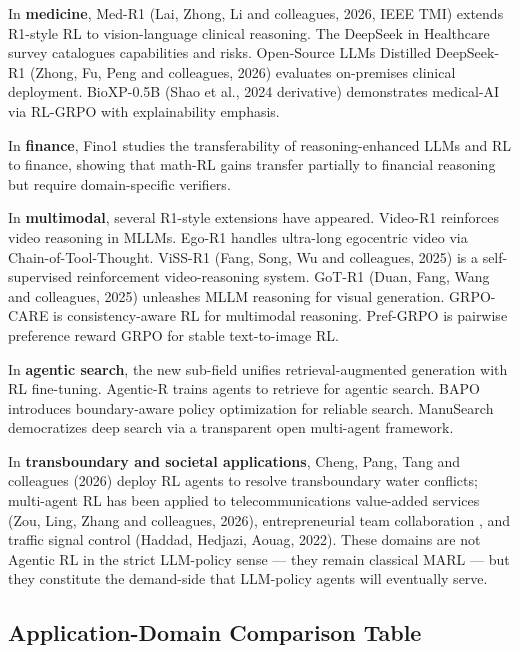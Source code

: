 \documentclass{article}
\begin{document}
In \textbf{medicine}, Med-R1 (Lai, Zhong, Li and colleagues, 2026, IEEE TMI) extends R1-style RL to vision-language clinical reasoning. The DeepSeek in Healthcare survey \citep{ye20242024} catalogues capabilities and risks. Open-Source LLMs Distilled DeepSeek-R1 (Zhong, Fu, Peng and colleagues, 2026) evaluates on-premises clinical deployment. BioXP-0.5B (Shao et al., 2024 derivative) demonstrates medical-AI via RL-GRPO with explainability emphasis.

In \textbf{finance}, Fino1 \citep{qian20252025} studies the transferability of reasoning-enhanced LLMs and RL to finance, showing that math-RL gains transfer partially to financial reasoning but require domain-specific verifiers.

In \textbf{multimodal}, several R1-style extensions have appeared. Video-R1 \citep{feng20252025} reinforces video reasoning in MLLMs. Ego-R1 \citep{tian20252025} handles ultra-long egocentric video via Chain-of-Tool-Thought. ViSS-R1 (Fang, Song, Wu and colleagues, 2025) is a self-supervised reinforcement video-reasoning system. GoT-R1 (Duan, Fang, Wang and colleagues, 2025) unleashes MLLM reasoning for visual generation. GRPO-CARE \citep{chen20252025} is consistency-aware RL for multimodal reasoning. Pref-GRPO \citep{wang20252025} is pairwise preference reward GRPO for stable text-to-image RL.

In \textbf{agentic search}, the new sub-field unifies retrieval-augmented generation with RL fine-tuning. Agentic-R \citep{liu20262026} trains agents to retrieve for agentic search. BAPO \citep{liu20262026} introduces boundary-aware policy optimization for reliable search. ManuSearch \citep{huang20252025} democratizes deep search via a transparent open multi-agent framework.

In \textbf{transboundary and societal applications}, Cheng, Pang, Tang and colleagues (2026) deploy RL agents to resolve transboundary water conflicts; multi-agent RL has been applied to telecommunications value-added services (Zou, Ling, Zhang and colleagues, 2026), entrepreneurial team collaboration \citep{wang20262026}, and traffic signal control (Haddad, Hedjazi, Aouag, 2022). These domains are not Agentic RL in the strict LLM-policy sense --- they remain classical MARL --- but they constitute the demand-side that LLM-policy agents will eventually serve.

\subsection{Application-Domain Comparison Table}\label{application-domain-comparison-table}
\end{document}
